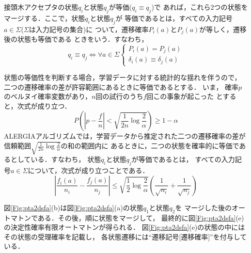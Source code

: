 接頭木アクセプタの状態$q_{i}$と状態$q_{j}$が等価(\(q_{i} \equiv q_{j}\))で
あれば，これら2つの状態をマージする．ここで，状態$q_{i}$\hspace{-0.2mm}と状態$q_{j}$\hspace{-0.2mm}が
等価であるとは，すべての入力記号\(a \in \Sigma\)($\Sigma$は入力記号の集合)に
ついて，遷移確率$P_{i}(a)$と$P_{j}(a)$が等しく，遷移後の状態も等価である
ときをいう．すなわち，
\begin{equation}
q_{i} \equiv q_{j}
	\Longleftrightarrow
		\forall a \in \Sigma
			\left\{
			\begin{array}{l}
				P_{i}(a)=P_{j}(a)\\
				\delta_{i}(a) \equiv \delta_{j}(a)
			\end{array}
			\right.
\end{equation}

状態の等価性を判断する場合，学習データに対する統計的な揺れを伴うので，
二つの遷移確率の差が許容範囲にあるときに等価であるとする．
いま，
確率$p$のベルヌイ確率変数があり，$n$回の試行のうち$f$回この事象が起こった
とすると，次式が成り立つ．
\begin{equation}
P \left( \left| p - \frac{f}{n} \right| <
	\sqrt{\frac{1}{2n} \log \frac{2}{\alpha}} \right)
		\geq
			1 - \alpha
\end{equation}
ALERGIAアルゴリズムでは，学習データから推定された二つの遷移確率の差が
信頼範囲\(\sqrt{\frac{1}{2n} \log \frac{2}{\alpha}}\)の和の範囲内に
あるときに，二つの状態を確率的に等価であるとしている．すなわち，
状態$q_{i}$\hspace{-0.2mm}と状態$q_{j}$\hspace{-0.2mm}が等価であるとは，
すべての入力記号\(a \in \Sigma\)について，次式が成り立つことである．
\begin{equation}
\left| \frac{f_{i}(a)}{n_{i}} - \frac{f_{j}(a)}{n_{j}} \right|
	\leq
		\sqrt{\frac{1}{2} \log \frac{2}{\alpha}}
			\left(
				\frac{1}{\sqrt{n_{i}}} + \frac{1}{\sqrt{n_{j}}}
			\right)
\label{Eq:eq_state}
\end{equation}

図\ref{Fig:pta2dsfa}(b)は図\ref{Fig:pta2dsfa}(a)の状態$q_1$\hspace{-0.2mm}と状態$q_2$\hspace{-0.2mm}を
マージした後のオートマトンである．その後，順に状態をマージして，
最終的に図\ref{Fig:pta2dsfa}(e)の決定性確率有限オートマトンが得られる．
図\ref{Fig:pta2dsfa}(e)の状態の中にはその状態の受理確率を記載し，
各状態遷移には``遷移記号[遷移確率]''を付与している．

